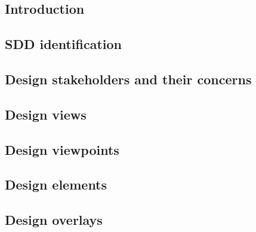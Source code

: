 \documentclass[letterpaper, 10pt, draftclsnofoot, compsoc, onecolumn]{IEEEtran}
\begin{document}
\vspace{1pc}
\subsection{Introduction}
\vspace{1pc}
{\noindent \par}

\vspace{1pc}
\subsection{SDD identification}
\vspace{1pc}
{\noindent \par}

\vspace{1pc}
\subsection{Design stakeholders and their concerns}
\vspace{1pc}
{\noindent \par}

\vspace{1pc}
\subsection{Design views}
\vspace{1pc}
{\noindent \par}

\vspace{1pc}
\subsection{Design viewpoints}
\vspace{1pc}
{\noindent \par}

\vspace{1pc}
\subsection{Design elements}
\vspace{1pc}
{\noindent \par}

\vspace{1pc}
\subsection{Design overlays}
\vspace{1pc}
{\noindent \par}
\end{document}
